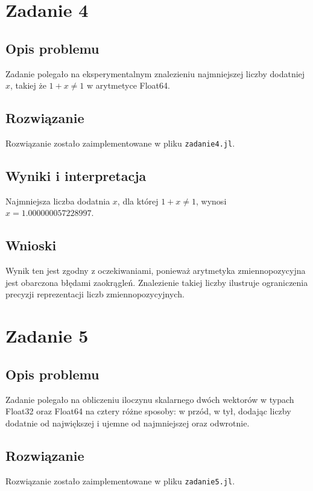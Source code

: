 \documentclass{article}
\begin{document}
\section{Zadanie 4}
\subsection{Opis problemu}
Zadanie polegało na eksperymentalnym znalezieniu najmniejszej liczby dodatniej $x$, takiej że $1+x \neq 1$ w arytmetyce Float64.

\subsection{Rozwiązanie}
Rozwiązanie zostało zaimplementowane w pliku \texttt{zadanie4.jl}.

\subsection{Wyniki i interpretacja}
Najmniejsza liczba dodatnia $x$, dla której $1+x \neq 1$, wynosi $x = 1.000000057228997$.

\subsection{Wnioski}
Wynik ten jest zgodny z oczekiwaniami, ponieważ arytmetyka zmiennopozycyjna jest obarczona błędami zaokrągleń. Znalezienie takiej liczby ilustruje ograniczenia precyzji reprezentacji liczb zmiennopozycyjnych.

\section{Zadanie 5}
\subsection{Opis problemu}
Zadanie polegało na obliczeniu iloczynu skalarnego dwóch wektorów w typach Float32 oraz Float64 na cztery różne sposoby: w przód, w tył, dodając liczby dodatnie od największej i ujemne od najmniejszej oraz odwrotnie.

\subsection{Rozwiązanie}
Rozwiązanie zostało zaimplementowane w pliku \texttt{zadanie5.jl}.
\end{document}
